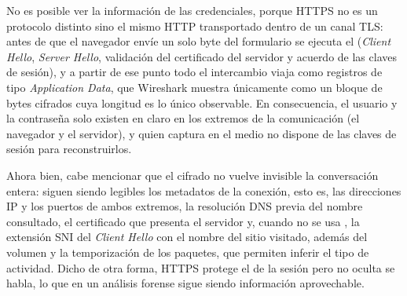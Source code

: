 
\begin{analisis}
\end{analisis}


\begin{analisis}
\end{analisis}

\begin{respuesta}
No es posible ver la información de las credenciales, porque HTTPS no es un protocolo distinto sino el mismo HTTP transportado dentro de un canal TLS: antes de que el navegador envíe un solo byte del formulario se ejecuta el  (\emph{Client Hello}, \emph{Server Hello}, validación del certificado del servidor y acuerdo de las claves de sesión), y a partir de ese punto todo el intercambio viaja como registros de tipo \emph{Application Data}, que Wireshark muestra únicamente como un bloque de bytes cifrados cuya longitud es lo único observable. En consecuencia, el usuario y la contraseña solo existen en claro en los extremos de la comunicación (el navegador y el servidor), y quien captura en el medio no dispone de las claves de sesión para reconstruirlos.

Ahora bien, cabe mencionar que el cifrado no vuelve invisible la conversación entera: siguen siendo legibles los metadatos de la conexión, esto es, las direcciones IP y los puertos de ambos extremos, la resolución DNS previa del nombre consultado, el certificado que presenta el servidor y, cuando no se usa , la extensión SNI del \emph{Client Hello} con el nombre del sitio visitado, además del volumen y la temporización de los paquetes, que permiten inferir el tipo de actividad. Dicho de otra forma, HTTPS protege el  de la sesión pero no oculta  se habla, lo que en un análisis forense sigue siendo información aprovechable.
\end{respuesta}
